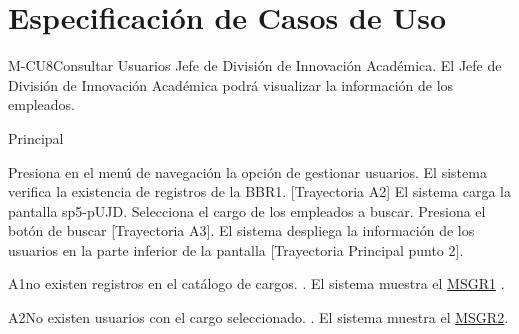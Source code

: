 \chapter{Especificación de Casos de Uso}

\begin{UseCase}{M-CU8}{Consultar Usuarios Jefe de División de Innovación Académica. }{El  Jefe de División de Innovación Académica podrá visualizar la información de los empleados.}
\end{UseCase}

\begin{UCtrayectoria}{Principal}
    
    \UCpaso[\UCactor] Presiona en el menú de navegación la opción de gestionar usuarios. 
    \UCpaso  El sistema verifica la existencia de registros de la BBR1. [Trayectoria A2] 
    \UCpaso El sistema carga la pantalla sp5-pUJD.
    \UCpaso[\UCactor] Selecciona el cargo de los empleados a buscar. 
    \UCpaso[\UCactor]  Presiona el botón de buscar [Trayectoria A3].
    \UCpaso El sistema despliega la información de los usuarios en la parte inferior de la pantalla [Trayectoria Principal punto 2].
\end{UCtrayectoria}

\begin{UCtrayectoriaA}{A1}{no existen registros en el catálogo de cargos.}
	.	El sistema muestra el \hyperref[itm:MSGR1]{MSGR1} .
\end{UCtrayectoriaA}

\begin{UCtrayectoriaA}{A2}{No existen  usuarios con el cargo seleccionado.}
	.	El sistema muestra el \hyperref[MSGR2]{MSGR2}.
\end{UCtrayectoriaA}